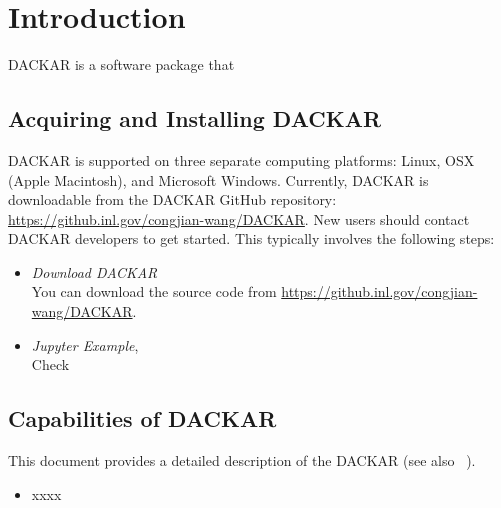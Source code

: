 \section{Introduction}
\label{sec:Introduction}

DACKAR is a software package that

\subsection{Acquiring and Installing DACKAR}
DACKAR is supported on three separate computing platforms: Linux, OSX (Apple Macintosh), and Microsoft
Windows. Currently, DACKAR is downloadable from the DACKAR GitHub repository:
\url{https://github.inl.gov/congjian-wang/DACKAR}. New users should contact DACKAR developers to
get started. This typically involves the following steps:

\begin{itemize}
  \item \textit{Download DACKAR}
    \\ You can download the source code from \url{https://github.inl.gov/congjian-wang/DACKAR}.
	\item \textit{Jupyter Example},
    \\ Check
\end{itemize}

\subsection{Capabilities of DACKAR}
This document provides a detailed description of the DACKAR (see also ~\cite{dackarReport}).
\begin{itemize}
	\item xxxx
\end{itemize}
